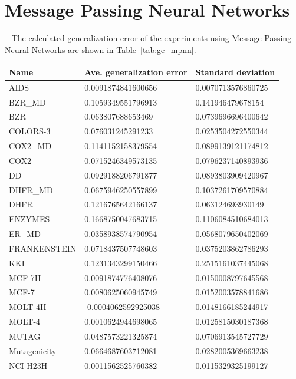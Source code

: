 \section{Message Passing Neural Networks}~\label{sec:result_mpnn}
The calculated generalization error of the experiments using Message Passing Neural Networks are shown in Table~\ref{tab:ge_mpnn}.


\begin{table}[!ht]
    \centering
    \footnotesize
    \begin{tabular}{p{3.5cm}|p{5cm}p{5cm}}
    \hline
    \toprule
        Name & Ave. generalization error & Standard deviation \\ 
    \midrule
    AIDS & 0.0091874841600656 & 0.0070713576860725 \\ 
    BZR\_MD & 0.1059349551796913 & 0.141946479678154 \\ 
    BZR & 0.063807688653469 & 0.0739696696400642 \\ 
    COLORS-3 & 0.076031245291233 & 0.0253504272550344 \\ 
    COX2\_MD & 0.1141152158379554 & 0.0899139121174812 \\ 
    COX2 & 0.0715246349573135 & 0.0796237140893936 \\ 
    DD & 0.0929188206791877 & 0.0893803909420967 \\ 
    DHFR\_MD & 0.0675946250557899 & 0.1037261709570884 \\ 
    DHFR & 0.1216765642166137 & 0.063124693930149 \\ 
    ENZYMES & 0.1668750047683715 & 0.1106084510684013 \\ 
    ER\_MD & 0.0358938574790954 & 0.0568079650402069 \\ 
    FRANKENSTEIN & 0.0718437507748603 & 0.0375203862786293 \\ 
    KKI & 0.1231343299150466 & 0.2515161037445068 \\ 
    MCF-7H & 0.0091874776408076 & 0.0150008797645568 \\ 
    MCF-7 & 0.0080625060945749 & 0.0152003578841686 \\ 
    MOLT-4H & -0.0004062592925038 & 0.0148166185244917 \\ 
    MOLT-4 & 0.0010624944698065 & 0.0125815030187368 \\ 
    MUTAG & 0.0487573221325874 & 0.0706913545727729 \\ 
    Mutagenicity & 0.0664687603712081 & 0.0282005369663238 \\ 
    NCI-H23H & 0.0011562525760382 & 0.0115329325199127 \\ 

\end{tabular}
\end{table}
